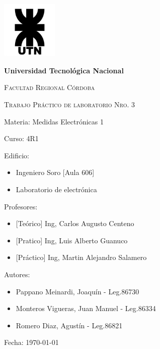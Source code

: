 \documentclass[12pt, letterpaper]{article}
\begin{document}
\begin{titlepage}
	\centering %
	{\includegraphics[width=0.2\textwidth]{imagenes/UTN_logo.jpg}\par}
	{\bfseries\LARGE Universidad Tecnológica Nacional \par}
	{\scshape\Large Facultad Regional Córdoba\par}
	\vspace{0.5cm}
	{\scshape\Huge Trabajo Práctico de laboratorio Nro. 3  \par}%
	\raggedright %
	\vspace{0.5cm}
	{\Large Materia: Medidas Electrónicas 1 \par}%
	\vspace{0.5cm}
	{\Large Curso: 4R1 \par}
	\vspace{0.5cm}
	{\Large Edificio: \par}%
	\begin{itemize}
		\item{\Large Ingeniero Soro [Aula 606] \par}
		\item{\Large Laboratorio de electrónica \par}
	\end{itemize}
	\vspace{0.5cm}
	{\Large Profesores: \par} %
	\begin{itemize}
		\item{\Large [Teórico] Ing, Carlos Augusto Centeno \par}
		\item{\Large [Pratico] Ing, Luis Alberto Guanuco \par}
		\item{\Large [Práctico] Ing, Martin Alejandro Salamero \par}
	\end{itemize}
	\vspace{0.5cm}
	{\Large Autores: \par} %
	\begin{itemize}
		\item{\Large Pappano Meinardi, Joaquín - Leg.86730\par}
		\item{\Large Monteros Vigueras, Juan Manuel - Leg.86334\par}
		\item{\Large Romero Diaz, Agustín - Leg.86821\par}
	\end{itemize}
	\vspace{0.5cm}
	{\Large Fecha: {\today} \par}%
\end{titlepage}
\end{document}
